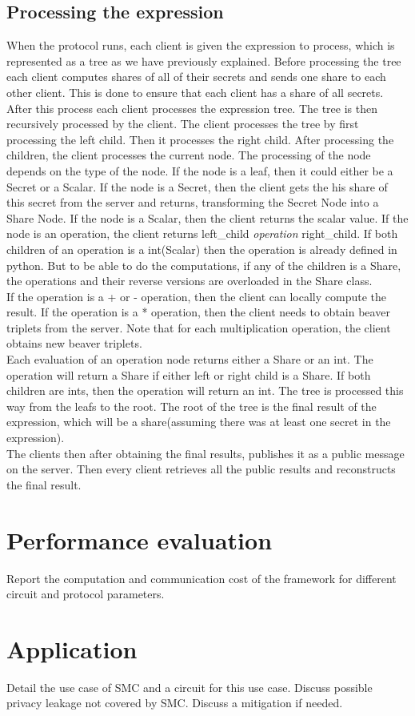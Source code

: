 \documentclass[10pt,conference,compsocconf]{IEEEtran}
\begin{document}
\subsection{Processing the expression}
\label{processing}
When the protocol runs, each client is given the expression to process, which is represented as a tree as we have previously explained. Before processing the tree
each client computes shares of all of their secrets and sends one share to each other client. This is done to ensure that each client has a share of all secrets.
After this process each client processes the expression tree. The tree is then recursively processed by the client.
The client processes the tree by first processing the left child. Then it processes the right child. After processing the children, 
the client processes the current node. The processing of the node depends on the type of the node. If the node is a leaf, then it could either be 
a Secret or a Scalar. If the node is a Secret, then the client gets the his share of this secret from the server and returns, transforming the Secret Node into a Share Node.
If the node is a Scalar, then the client returns the scalar value. If the node is an operation, the client returns left\_child \textit{operation} right\_child.
If both children of an operation is a int(Scalar) then the operation is already defined in python. But to be able to do the computations, 
if any of the children is a Share, the operations and their reverse versions are overloaded in the Share class.
\\ 
If the operation is a + or - operation, then the client can locally compute the result. If the operation is a * operation, then the client needs to obtain beaver triplets from the server. 
Note that for each multiplication operation, the client obtains new beaver triplets. 
\\ 
Each evaluation of an operation node returns either a Share or an int. The operation will return a Share if either left or right child is a Share. If both children are ints, then the operation will return an int.
The tree is processed this way from the leafs to the root. The root of the tree is the final result of the expression, which will be a share(assuming there was at least one secret in the expression).
\\
The clients then after obtaining the final results, publishes it as a public message on the server. Then every client retrieves all the public results and reconstructs the final result.

\section{Performance evaluation}
\label{perf_eval}
Report the computation and communication cost of the framework for different circuit and protocol parameters.

\section{Application}
\label{use_case}
Detail the use case of SMC and a circuit for this use case. Discuss possible privacy leakage not
covered by SMC. Discuss a mitigation if needed.


\end{document}
